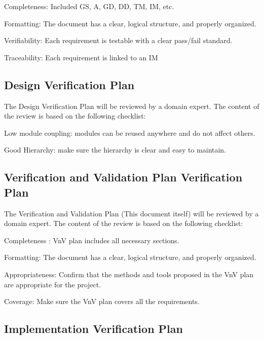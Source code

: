 \documentclass[12pt, titlepage]{article}
\begin{document}
\begin{todolist}
  \item Completeness: Included GS, A, GD, DD, TM, IM, etc.
  \item Formatting: The document has a clear, logical structure, and properly
  organized.
  \item Verifiability: Each requirement is testable with a clear pass/fail
  standard.
  \item Traceability: Each requirement is linked to an IM
\end{todolist}

\subsection{Design Verification Plan}

The Design Verification Plan will be reviewed by a domain expert.  The content
of the review is based on the following checklist:

\begin{todolist}
  \item Low module coupling: modules can be reused anywhere and do not affect
  others.
  \item Good Hierarchy: make sure the hierarchy is clear and easy to maintain.
\end{todolist}

\subsection{Verification and Validation Plan Verification Plan}

The Verification and Validation Plan (This document itself) will be reviewed by
a domain expert.  The content of the review is based on the following checklist:

\begin{todolist}
  \item Completeness : VnV plan includes all necessary sections.
  \item Formatting: The document has a clear, logical structure, and properly
  organized.
  \item Appropriateness: Confirm that the methods and tools proposed in the VnV
  plan are appropriate for the project.
  \item Coverage: Make sure the VnV plan covers all the requirements.
\end{todolist}

\subsection{Implementation Verification Plan}
\end{document}
